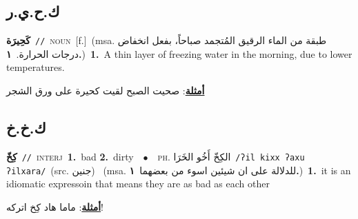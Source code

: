 \documentclass[10pt,a4paper,twoside]{article} %
\begin{document}
\begin{multicols}{2}
\vspace{-3mm}
\subsection*{\color{blue}\foreignlanguage{arabic}{ك.ح.ي.ر}\color{blue}{}} 

{\setlength\topsep{0pt}\textbf{\foreignlanguage{arabic}{كَحِيرَة}}\ {\color{gray}\texttt{//}\color{black}}\ \textsc{noun}\ [f.]\ \color{gray}(msa. \foreignlanguage{arabic}{طبقة من الماء الرقيق المُتجمد صباحاً، بفعل انخفاض درجات الحرارة.}~\foreignlanguage{arabic}{\textbf{١.}})\color{black}\ \textbf{1.}~A thin layer of freezing water in the morning, due to lower temperatures.\  \begin{flushright}\color{gray}\foreignlanguage{arabic}{\textbf{\underline{\foreignlanguage{arabic}{أمثلة}}}: صحيت الصبح لقيت كحيرة على ورق الشجر}\end{flushright}\color{black}} \vspace{2mm}

\vspace{-3mm}
\subsection*{\color{blue}\foreignlanguage{arabic}{ك.خ.خ}\color{blue}{}} 

{\setlength\topsep{0pt}\textbf{\foreignlanguage{arabic}{كِخّ}}\ {\color{gray}\texttt{//}\color{black}}\ \textsc{interj}\ \textbf{1.}~bad  \textbf{2.}~dirty\ \ $\bullet$\ \ \textsc{ph.} \color{gray} \foreignlanguage{arabic}{الكِخّ أَخُو الخَرَا}\color{black}\ {\color{gray}\texttt{/{\sffamily ʔil kixx ʔaxu ʔilxara}/}\color{black}}\ \color{gray}(src. \foreignlanguage{arabic}{جنين})\color{black}\ \color{gray} (msa. \foreignlanguage{arabic}{للدلالة على ان شيئين اسوء من بعضهما}~\foreignlanguage{arabic}{\textbf{١.}})\color{black}\ \textbf{1.}~it is an idiomatic expressoin that means they are as bad as each other\  \begin{flushright}\color{gray}\foreignlanguage{arabic}{\textbf{\underline{\foreignlanguage{arabic}{أمثلة}}}: ماما هاد كِخ اتركه!}\end{flushright}\color{black}} \vspace{2mm}


\end{multicols}
\end{document}
